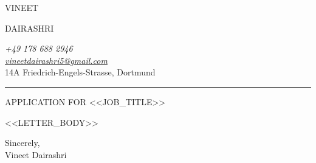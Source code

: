 \documentclass[11pt,a4paper]{article}
\begin{document}
\selectfont %

\noindent
\begin{minipage}[t]{0.4\textwidth}
\vspace{0pt}
\vspace{0.3em}
{\fontsize{17}{22}\selectfont\setlength{\parskip}{0pt}
\MakeUppercase{Vineet}\par
\MakeUppercase{Dairashri}\par}
\end{minipage}%
\hfill
\begin{minipage}[t]{0.5\textwidth}
\vspace{0pt}
\begin{flushright}
\textit{+49 178 688 2946} \\
\textit{\href{mailto:vineetdairashri5@gmail.com}{vineetdairashri5@gmail.com}} \\
14A Friedrich-Engels-Strasse, Dortmund
\end{flushright}
\end{minipage}

\vspace{1em}
\hrule
\vspace{2.5em}

{\fontsize{14}{18}\selectfont\MakeUppercase{Application for <<JOB_TITLE>>}\par}

\vspace{1.5em}

\selectfont

<<LETTER_BODY>>

\vspace{2em}

Sincerely, \\
Vineet Dairashri
\end{document}
